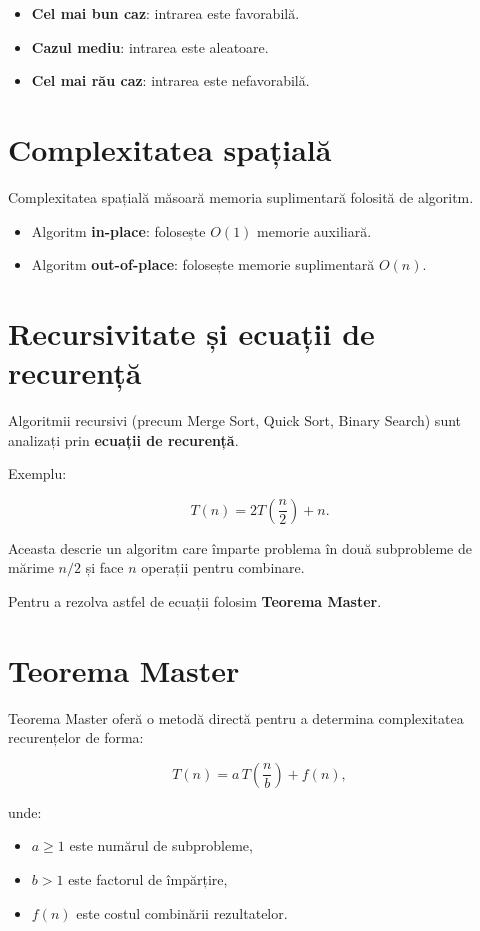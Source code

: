 \documentclass[12pt]{article}
\begin{document}
\begin{itemize}
    \item \textbf{Cel mai bun caz}: intrarea este favorabilă.
    \item \textbf{Cazul mediu}: intrarea este aleatoare.
    \item \textbf{Cel mai rău caz}: intrarea este nefavorabilă.
\end{itemize}

\section{Complexitatea spațială}

Complexitatea spațială măsoară memoria suplimentară folosită de algoritm.

\begin{itemize}
    \item Algoritm \textbf{in-place}: folosește $O(1)$ memorie auxiliară.
    \item Algoritm \textbf{out-of-place}: folosește memorie suplimentară $O(n)$.
\end{itemize}

\section{Recursivitate și ecuații de recurență}

Algoritmii recursivi (precum Merge Sort, Quick Sort, Binary Search) sunt analizați
prin \textbf{ecuații de recurență}.

Exemplu:


\[
T(n) = 2T\left(\frac{n}{2}\right) + n.
\]



Aceasta descrie un algoritm care împarte problema în două subprobleme de mărime
$n/2$ și face $n$ operații pentru combinare.

Pentru a rezolva astfel de ecuații folosim \textbf{Teorema Master}.

\section{Teorema Master}

Teorema Master oferă o metodă directă pentru a determina complexitatea recurențelor
de forma:


\[
T(n) = a\,T\left(\frac{n}{b}\right) + f(n),
\]


unde:
\begin{itemize}
    \item $a \ge 1$ este numărul de subprobleme,
    \item $b > 1$ este factorul de împărțire,
    \item $f(n)$ este costul combinării rezultatelor.
\end{itemize}
\end{document}

